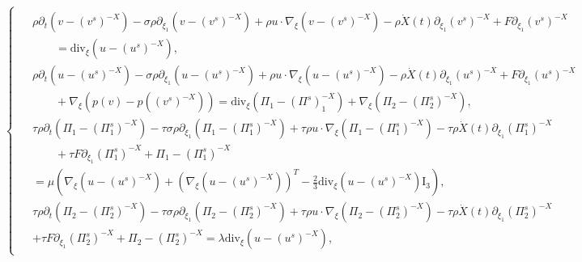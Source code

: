 \documentclass[10pt,a4paper]{amsart}
\newcommand{\ddiv}{\mathrm{div}}
\begin{document}
\begin{equation}\label{sys1}
\begin{cases}
\begin{aligned}
&\rho\partial_t\left(v-(v^s)^{-X}\right)-\sigma\rho\partial_{\xi_1}\left(v-(v^s)^{-X}\right)
        +\rho u\cdot\nabla_{\xi}\left(v-(v^s)^{-X}\right)-\rho\dot{X}(t)\partial_{\xi_1}(v^s)^{-X}
        +F\partial_{\xi_1}(v^s)^{-X}\\
 &\qquad=\ddiv_{\xi}\left(u-(u^s)^{-X}\right),\\
&\rho\partial_t\left(u-(u^s)^{-X}\right)-\sigma\rho\partial_{\xi_1}\left(u-(u^s)^{-X}\right)
        +\rho u\cdot\nabla_{\xi}\left(u-(u^s)^{-X}\right)-\rho\dot{X}(t)\partial_{\xi_1}(u^s)^{-X} +F\partial_{\xi_1}(u^s)^{-X}\\
&\qquad  +\nabla_{\xi}\left(p(v)-p((v^s)^{-X})\right)
               =\ddiv_{\xi}\left(\Pi_1-(\Pi^s)_1^{-X}\right)+\nabla_{\xi}\left(\Pi_2-(\Pi_2^s)^{-X}\right),\\
&\tau\rho\partial_t\left(\Pi_1-(\Pi_1^s)^{-X}\right)-\tau\sigma\rho\partial_{\xi_1}\left(\Pi_1-(\Pi_1^s)^{-X}\right)
+\tau\rho u\cdot\nabla_{\xi} \left(\Pi_1-(\Pi_1^s)^{-X}\right)-\tau\rho\dot{X}(t)\partial_{\xi_1}(\Pi_1^s)^{-X}\\
&\qquad +\tau F\partial_{\xi_1}(\Pi_1^s)^{-X}+\Pi_1-(\Pi_1^s)^{-X}\\
 &  =\mu\left(\nabla_{\xi}\left(u-(u^s)^{-X}\right)+\left(\nabla_{\xi}\left(u-(u^s)^{-X}\right)\right)^T
   -\frac{2}{3}\ddiv_{\xi}\left(u-(u^s)^{-X}\right) \mathrm{I}_3\right),\\
&\tau\rho\partial_t\left(\Pi_2-(\Pi_2^s)^{-X}\right)-\tau\sigma\rho\partial_{\xi_1}\left(\Pi_2-(\Pi_2^s)^{-X}\right)
+\tau\rho u\cdot\nabla_{\xi} \left(\Pi_2-(\Pi_2^s)^{-X}\right)-\tau\rho\dot{X}(t)\partial_{\xi_1}(\Pi_2^s)^{-X}\\
&+\tau F\partial_{\xi_1}(\Pi_2^s)^{-X}+\Pi_2-(\Pi_2^s)^{-X}
=\lambda\ddiv_{\xi} \left(u-(u^s)^{-X}\right),
\end{aligned}
\end{cases}
\end{equation}
\end{document}
